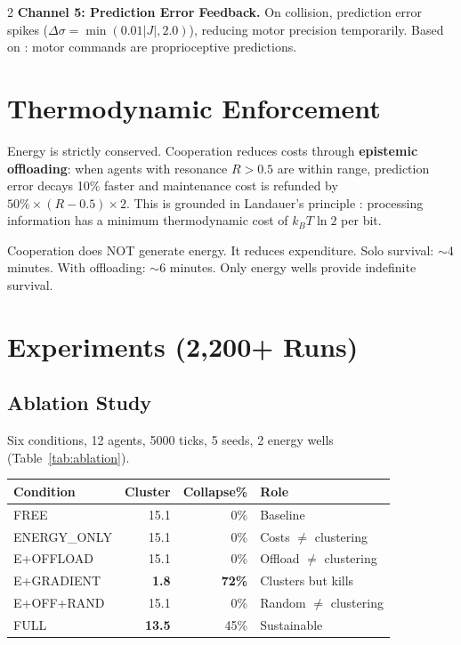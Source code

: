 \documentclass[letterpaper]{article}
\begin{document}
\begin{multicols}{2}
\textbf{Channel 5: Prediction Error Feedback.} On collision, prediction error spikes ($\Delta\sigma = \min(0.01|J|, 2.0)$), reducing motor precision temporarily. Based on \citet{adams2013}: motor commands are proprioceptive predictions.

\section{Thermodynamic Enforcement}

Energy is strictly conserved. Cooperation reduces costs through \textbf{epistemic offloading}: when agents with resonance $R > 0.5$ are within range, prediction error decays 10\% faster and maintenance cost is refunded by $50\% \times (R-0.5) \times 2$. This is grounded in Landauer's principle \citep{landauer1961}: processing information has a minimum thermodynamic cost of $k_BT\ln 2$ per bit.

Cooperation does NOT generate energy. It reduces expenditure. Solo survival: $\sim$4 minutes. With offloading: $\sim$6 minutes. Only energy wells provide indefinite survival.

\section{Experiments (2,200+ Runs)}

\subsection{Ablation Study}

Six conditions, 12 agents, 5000 ticks, 5 seeds, 2 energy wells (Table~\ref{tab:ablation}).

\begingroup
\centering
\small
{}
\label{tab:ablation}
\begin{tabular}{lrrl}
\toprule
Condition & Cluster & Collapse\% & Role \\
\midrule
FREE & 15.1 & 0\% & Baseline \\
ENERGY\_ONLY & 15.1 & 0\% & Costs $\neq$ clustering \\
E+OFFLOAD & 15.1 & 0\% & Offload $\neq$ clustering \\
E+GRADIENT & \textbf{1.8} & \textbf{72\%} & Clusters but kills \\
E+OFF+RAND & 15.1 & 0\% & Random $\neq$ clustering \\
FULL & \textbf{13.5} & 45\% & Sustainable \\
\bottomrule
\end{tabular}
\endgroup


\end{multicols}
\end{document}
